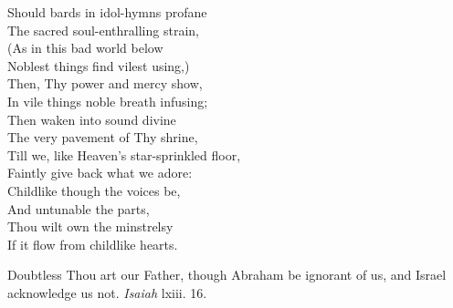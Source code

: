  Should bards in idol-hymns profane \\
 The sacred soul-enthralling strain, \\
 (As in this bad world below \\
 Noblest things find vilest using,) \\
 Then, Thy power and mercy show, \\
 In vile things noble breath infusing; \\
  Then waken into sound divine \\
 The very pavement of Thy shrine, \\
 Till we, like Heaven’s star-sprinkled floor, \\
 Faintly give back what we adore: \\
 Childlike though the voices be, \\
 And untunable the parts, \\
 Thou wilt own the minstrelsy \\
 If it flow from childlike hearts.\\


Doubtless Thou art our Father, though Abraham be ignorant of us, and Israel acknowledge us not. \emph{Isaiah} lxiii. 16.

